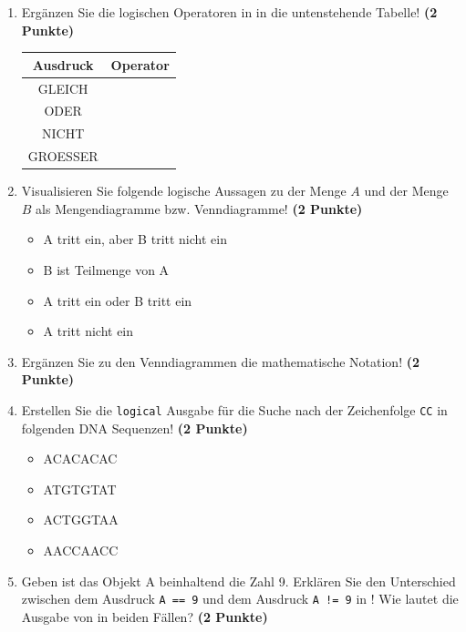 \documentclass[a4paper, 10pt]{scrartcl}\usepackage[]{graphicx}\usepackage[]{xcolor}
\begin{document}
\vspace{1Ex}



\begin{enumerate}
\item Erg{\"a}nzen Sie die logischen Operatoren in \Rlogo in die untenstehende Tabelle!
  \textbf{(2 Punkte)}
  \begin{center}
    \begin{tabular}{c|c}
      \textbf{Ausdruck} & \textbf{Operator} \strut\\ \hline
      GLEICH  & \phantom{GLEICH}\strut\\ \hline
      ODER  & \phantom{ODER}\strut\\ \hline
      NICHT  & \phantom{NICHT}\strut\\ \hline
      GROESSER  & \phantom{GROESSER}\strut\\ 
    \end{tabular}
  \end{center}  
\item Visualisieren Sie folgende logische Aussagen zu der Menge $A$ und der Menge
  $B$ als Mengendiagramme bzw. Venndiagramme!
  \textbf{(2 Punkte)}
  \begin{itemize}
  \item A tritt ein, aber B tritt nicht ein
  \item B ist Teilmenge von A
  \item A tritt ein oder B tritt ein
  \item A tritt nicht ein
  \end{itemize}
\item Erg{\"a}nzen Sie zu den Venndiagrammen die mathematische Notation!
  \textbf{(2 Punkte)}
\item Erstellen Sie die \texttt{logical} \Rlogo Ausgabe f{\"u}r die
  Suche nach der Zeichenfolge \texttt{CC} in folgenden DNA
  Sequenzen! \textbf{(2 Punkte)}
  \begin{itemize}
  \item ACACACAC
  \item ATGTGTAT
  \item ACTGGTAA
  \item AACCAACC
  \end{itemize}
\item Geben ist das \Rlogo Objekt A beinhaltend die Zahl
  9. Erkl{\"a}ren Sie den Unterschied zwischen dem Ausdruck \texttt{A == 9}
  und dem Ausdruck \texttt{A != 9} in \Rlogo! Wie lautet die Ausgabe von \Rlogo
  in beiden F{\"a}llen? \textbf{(2 Punkte)}
\end{enumerate}
\end{document}
